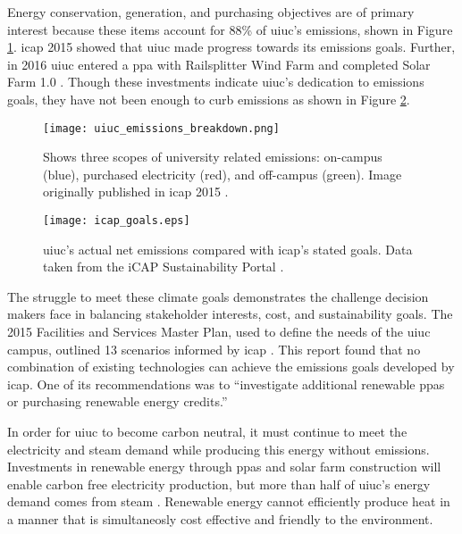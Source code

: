 Energy conservation, generation, and purchasing objectives are of primary
interest because these items account for 88\% of \gls{uiuc}'s emissions, shown
in Figure \ref{fig:uiuc_emissions_breakdown}. \gls{icap} 2015 showed that
\gls{uiuc} made progress towards its emissions goals. Further, in 2016
\gls{uiuc} entered a \gls{ppa} with Railsplitter Wind Farm
\cite{breitweiser_wind_2016} and completed Solar Farm 1.0
\cite{white_solar_2017}. Though these investments indicate \gls{uiuc}'s dedication to
emissions goals, they have not been enough to curb emissions as shown in Figure
\ref{fig:uiuc_ghg}.

\begin{figure}[ht!]
  \centering
  \texttt{[image: uiuc\_emissions\_breakdown.png]}
  \caption{Shows three scopes of university related emissions: on-campus
  (blue), purchased electricity (red), and off-campus (green). Image originally
  published in \gls{icap} 2015 \cite{isee_illinois_2015}.}
  \label{fig:uiuc_emissions_breakdown}
\end{figure}

\begin{figure}[h]
  \centering
  \texttt{[image: icap\_goals.eps]}
  \caption{\gls{uiuc}'s actual net emissions compared with \gls{icap}'s
  stated goals. Data taken from the iCAP Sustainability Portal
  \cite{noauthor_metric_nodate}.}
    \label{fig:uiuc_ghg}
\end{figure}

The struggle to meet these climate goals demonstrates the challenge decision
makers face in balancing stakeholder interests, cost, and sustainability goals.
The 2015 Facilities and Services Master Plan, used to define the needs of the
\gls{uiuc} campus, outlined 13 scenarios informed by \gls{icap}
\cite{affiliated_engineers_inc_utilities_2015}. This report found that no
combination of existing technologies can achieve the emissions goals developed
by \gls{icap}. One of its recommendations was to ``investigate additional
renewable \glspl{ppa} or purchasing renewable energy credits.''

In order for \gls{uiuc} to become carbon neutral, it must continue to meet the
electricity and steam demand while producing this energy without emissions.
Investments in renewable energy through \glspl{ppa} and solar
farm construction will enable carbon free electricity production, but more than
half of \gls{uiuc}'s energy demand comes from steam \cite{isee_illinois_2015}
. Renewable energy cannot
efficiently produce heat in a manner that is simultaneosly cost effective and
friendly to the environment.

